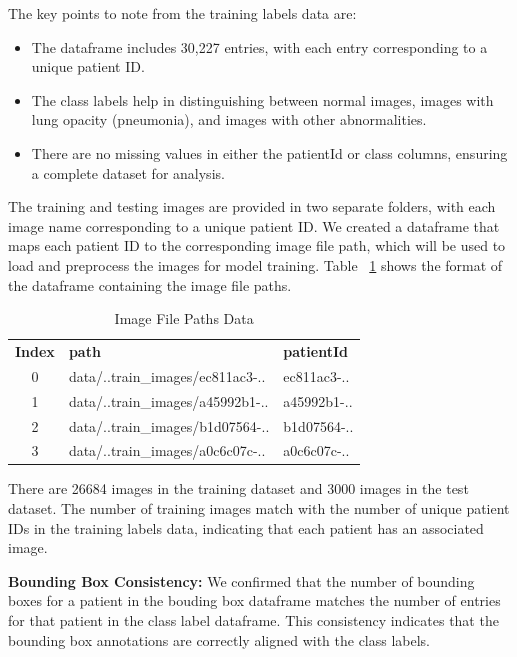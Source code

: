 The key points to note from the training labels data are:
\begin{itemize}
    \item The dataframe includes 30,227 entries, with each entry corresponding to a unique patient ID.
    \item The class labels help in distinguishing between normal images, images with lung opacity (pneumonia), and images with other abnormalities.
    \item There are no missing values in either the patientId or class columns, ensuring a complete dataset for analysis.
\end{itemize}

The training and testing images are provided in two separate folders, with each image name corresponding to a unique patient ID. We created a dataframe that maps each patient ID to the corresponding image file path, which will be used to load and preprocess the images for model training. Table ~\ref{tab:cha-2 table3} shows the format of the dataframe containing the image file paths.

\begin{table}[h!]
    \centering
    \caption{Image File Paths Data}
    \label{tab:cha-2 table3}
    \begin{adjustbox}{max width=\textwidth}
        \begin{tabularx}{\textwidth}{c|X|X}
            \rowcolor{gray!20}
            \textbf{Index} & \textbf{path}                    & \textbf{patientId} \\
            0              & data/..train\_images/ec811ac3-.. & ec811ac3-..        \\
            1              & data/..train\_images/a45992b1-.. & a45992b1-..        \\
            2              & data/..train\_images/b1d07564-.. & b1d07564-..        \\
            3              & data/..train\_images/a0c6c07c-.. & a0c6c07c-..        \\
        \end{tabularx}
    \end{adjustbox}
\end{table}

There are 26684 images in the training dataset and 3000 images in the test dataset. The number of training images match with the number of unique patient IDs in the training labels data, indicating that each patient has an associated image.

\textbf{Bounding Box Consistency:} We confirmed that the number of bounding boxes for a patient in the bouding box dataframe matches the number of entries for that patient in the class label dataframe. This consistency indicates that the bounding box annotations are correctly aligned with the class labels.

